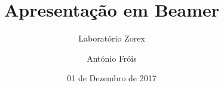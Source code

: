 \documentclass[10pt]{beamer}
\begin{document}
	\author{António Fróis}
	\title{Apresentação em Beamer}
	\subtitle{Laboratório Zorex}
	\date{01 de Dezembro de 2017}
	\subject{Produção de Documentos Técnicos}
	\begin{frame}[plain]
	\maketitle
\end{frame}
\end{document}
